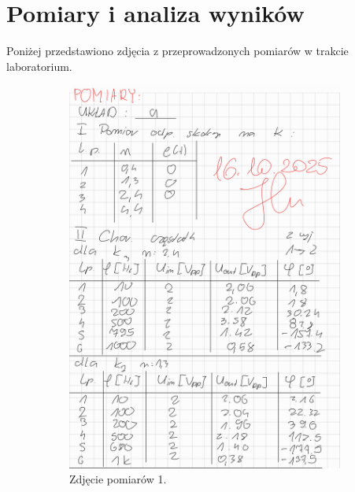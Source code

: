 \documentclass[12pt,a4paper]{article}
\begin{document}
	\newpage
	\section{Pomiary i analiza wyników}
	Poniżej przedstawiono zdjęcia z przeprowadzonych pomiarów w trakcie laboratorium.
	
	\begin{figure}[H]
		\centering
		\begin{subfigure}[b]{0.46\textwidth}
			\centering
			\includegraphics[width=\textwidth]{zdjecia/1.png}
			\caption{Zdjęcie pomiarów 1.}
			\label{fig:pomiar1}
		\end{subfigure}
		\hfill
		\begin{subfigure}[b]{0.46\textwidth}
			\centering

\end{subfigure}
\end{figure}
\end{document}
